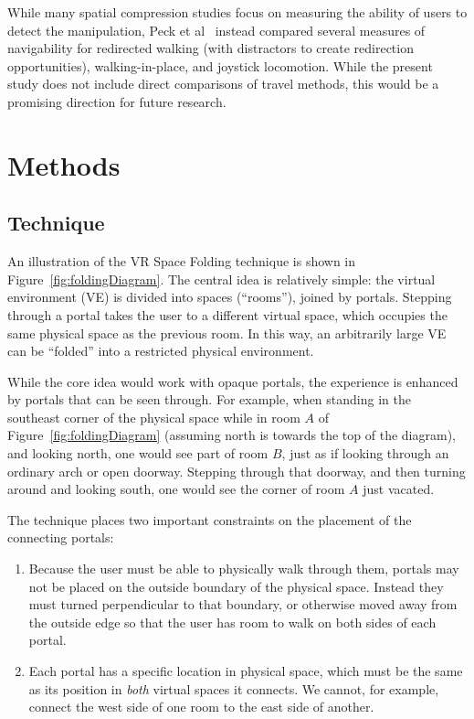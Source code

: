 \documentclass{sigchi}
\begin{document}
While many spatial compression studies focus on measuring the ability of users to detect the manipulation, Peck et al~\cite{peck2011evaluation} instead compared several measures of navigability for redirected walking (with distractors to create redirection opportunities), walking-in-place, and joystick locomotion.  While the present study does not include direct comparisons of travel methods, this would be a promising direction for future research.


\section{Methods}

\subsection{Technique}

An illustration of the VR Space Folding technique is shown in Figure~\ref{fig:foldingDiagram}.  The central idea is relatively simple: the virtual environment (VE) is divided into spaces (“rooms”), joined by portals.  Stepping through a portal takes the user to a different virtual space, which occupies the same physical space as the previous room.  In this way, an arbitrarily large VE can be “folded” into a restricted physical environment.

While the core idea would work with opaque portals, the experience is enhanced by portals that can be seen through.  For example, when standing in the southeast corner of the physical space while in room $A$ of Figure~\ref{fig:foldingDiagram} (assuming north is towards the top of the diagram), and looking north, one would see part of room $B$, just as if looking through an ordinary arch or open doorway.  Stepping through that doorway, and then turning around and looking south, one would see the corner of room $A$ just vacated.

The technique places two important constraints on the placement of the connecting portals:

\begin{enumerate}
\item Because the user must be able to physically walk through them, portals may not be placed on the outside boundary of the physical space.  Instead they must turned perpendicular to that boundary, or otherwise moved away from the outside edge so that the user has room to walk on both sides of each portal.

\item Each portal has a specific location in physical space, which must be the same as its position in \textit{both} virtual spaces it connects.  We cannot, for example, connect the west side of one room to the east side of another.
\end{enumerate}
\end{document}

